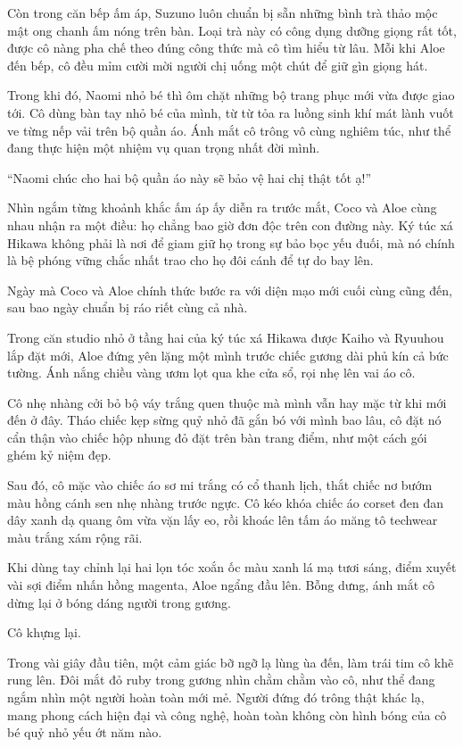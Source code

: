﻿\documentclass[../main.tex]{subfiles}
\begin{document}
Còn trong căn bếp ấm áp, Suzuno luôn chuẩn bị sẵn những bình trà thảo mộc mật ong chanh ấm nóng trên bàn. Loại trà này có công dụng dưỡng giọng rất tốt, được cô nàng pha chế theo đúng công thức mà cô tìm hiểu từ lâu. Mỗi khi Aloe đến bếp, cô đều mỉm cười mời người chị uống một chút để giữ gìn giọng hát.

Trong khi đó, Naomi nhỏ bé thì ôm chặt những bộ trang phục mới vừa được giao tới. Cô dùng bàn tay nhỏ bé của mình, từ từ tỏa ra luồng sinh khí mát lành vuốt ve từng nếp vải trên bộ quần áo. Ánh mắt cô trông vô cùng nghiêm túc, như thể đang thực hiện một nhiệm vụ quan trọng nhất đời mình.

``Naomi chúc cho hai bộ quần áo này sẽ bảo vệ hai chị thật tốt ạ!''

Nhìn ngắm từng khoảnh khắc ấm áp ấy diễn ra trước mắt, Coco và Aloe cùng nhau nhận ra một điều: họ chẳng bao giờ đơn độc trên con đường này. Ký túc xá Hikawa không phải là nơi để giam giữ họ trong sự bảo bọc yếu đuối, mà nó chính là bệ phóng vững chắc nhất trao cho họ đôi cánh để tự do bay lên.

\ct

Ngày mà Coco và Aloe chính thức bước ra với diện mạo mới cuối cùng cũng đến, sau bao ngày chuẩn bị ráo riết cùng cả nhà.

Trong căn studio nhỏ ở tầng hai của ký túc xá Hikawa được Kaiho và Ryuuhou lắp đặt mới, Aloe đứng yên lặng một mình trước chiếc gương dài phủ kín cả bức tường. Ánh nắng chiều vàng ươm lọt qua khe cửa sổ, rọi nhẹ lên vai áo cô.

Cô nhẹ nhàng cởi bỏ bộ váy trắng quen thuộc mà mình vẫn hay mặc từ khi mới đến ở đây. Tháo chiếc kẹp sừng quỷ nhỏ đã gắn bó với mình bao lâu, cô đặt nó cẩn thận vào chiếc hộp nhung đỏ đặt trên bàn trang điểm, như một cách gói ghém kỷ niệm đẹp.

Sau đó, cô mặc vào chiếc áo sơ mi trắng có cổ thanh lịch, thắt chiếc nơ bướm màu hồng cánh sen nhẹ nhàng trước ngực. Cô kéo khóa chiếc áo corset đen đan dây xanh dạ quang ôm vừa vặn lấy eo, rồi khoác lên tấm áo măng tô techwear màu trắng xám rộng rãi.

Khi dùng tay chỉnh lại hai lọn tóc xoắn ốc màu xanh lá mạ tươi sáng, điểm xuyết vài sợi điểm nhấn hồng magenta, Aloe ngẩng đầu lên. Bỗng dưng, ánh mắt cô dừng lại ở bóng dáng người trong gương.

Cô khựng lại.

Trong vài giây đầu tiên, một cảm giác bỡ ngỡ lạ lùng ùa đến, làm trái tim cô khẽ rung lên. Đôi mắt đỏ ruby trong gương nhìn chằm chằm vào cô, như thể đang ngắm nhìn một người hoàn toàn mới mẻ. Người đứng đó trông thật khác lạ, mang phong cách hiện đại và công nghệ, hoàn toàn không còn hình bóng của cô bé quỷ nhỏ yếu ớt năm nào.
\end{document}
